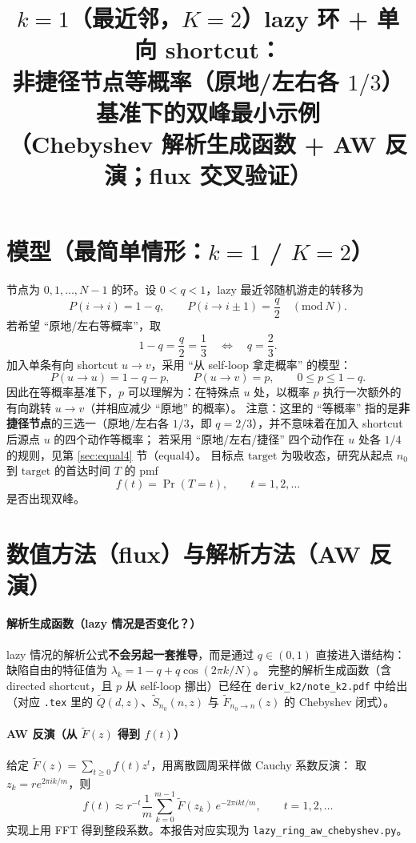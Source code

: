 \documentclass[11pt,fontset=fandol]{ctexart}
\title{$k=1$（最近邻，$K=2$）lazy 环 + 单向 shortcut：\\非捷径节点等概率（原地/左右各 $1/3$）基准下的双峰最小示例\\（Chebyshev 解析生成函数 + AW 反演；flux 交叉验证）}
\author{}
\date{}
\begin{document}
\sloppy
\maketitle

\section{模型（最简单情形：$k=1$ / $K=2$）}
节点为 $0,1,\dots,N-1$ 的环。设 $0<q<1$，lazy 最近邻随机游走的转移为
\[
P(i\to i)=1-q,\qquad P(i\to i\pm1)=\frac{q}{2}\quad(\mathrm{mod}\ N).
\]
若希望 ``原地/左右等概率''，取
\[
1-q=\frac{q}{2}=\frac{1}{3}\quad\Longleftrightarrow\quad q=\frac{2}{3}.
\]
加入单条有向 shortcut $u\to v$，采用 ``从 self-loop 拿走概率'' 的模型：
\[
P(u\to u)=1-q-p,\qquad P(u\to v)=p,\qquad 0\le p\le 1-q.
\]
因此在等概率基准下，$p$ 可以理解为：在特殊点 $u$ 处，以概率 $p$ 执行一次额外的有向跳转 $u\to v$（并相应减少 ``原地'' 的概率）。
注意：这里的 ``等概率'' 指的是\textbf{非捷径节点}的三选一（原地/左右各 $1/3$，即 $q=2/3$），并不意味着在加入 shortcut 后源点 $u$ 的四个动作等概率；
若采用 ``原地/左右/捷径'' 四个动作在 $u$ 处各 $1/4$ 的规则，见第 \ref{sec:equal4} 节（equal4）。
目标点 $\mathrm{target}$ 为吸收态，研究从起点 $n_0$ 到 $\mathrm{target}$ 的首达时间 $T$ 的 pmf
\[
f(t)=\Pr(T=t),\qquad t=1,2,\dots
\]
是否出现双峰。

\section{数值方法（flux）与解析方法（AW 反演）}
\paragraph{解析生成函数（lazy 情况是否变化？）}
lazy 情况的解析公式\textbf{不会另起一套推导}，而是通过 $q\in(0,1)$ 直接进入谱结构：
缺陷自由的特征值为 $\lambda_k=1-q+q\cos(2\pi k/N)$。
完整的解析生成函数（含 directed shortcut，且 $p$ 从 self-loop 挪出）已经在
\texttt{deriv\_k2/note\_k2.pdf} 中给出（对应 \texttt{.tex} 里的
$\tilde Q(d,z)$、$\tilde S_{n_0}(n,z)$ 与 $\tilde F_{n_0\to n}(z)$ 的 Chebyshev 闭式）。

\paragraph{AW 反演（从 $\tilde F(z)$ 得到 $f(t)$）}
给定 $\tilde F(z)=\sum_{t\ge0} f(t)z^t$，用离散圆周采样做 Cauchy 系数反演：
取 $z_k=r e^{2\pi i k/m}$，则
\[
f(t)\approx r^{-t}\frac{1}{m}\sum_{k=0}^{m-1}\tilde F(z_k)\,e^{-2\pi i k t/m},
\qquad t=1,2,\dots
\]
实现上用 FFT 得到整段系数。本报告对应实现为 \texttt{lazy\_ring\_aw\_chebyshev.py}。
\end{document}
